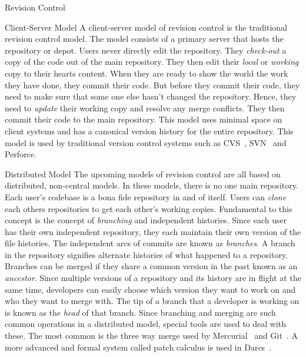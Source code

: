 \documentclass{article}
\begin{document}
\begin{section}{Revision Control}
	\begin{subsection}{Client-Server Model} A client-server model
	of revision control is the traditional revision control model.
	The model consists of a primary server that hosts the
	repository or depot.  Users never directly edit the
	repository.  They \emph{check-out} a copy of the code out of
	the main repository.  They then edit their \emph{local} or
	\emph{working} copy to their hearts content.  When they are
	ready to show the world the work they have done, they commit
	their code.  But before they commit their code, they need to
	make sure that some one else hasn't changed the repository.
	Hence, they need to \emph{update} their working copy and
	resolve any merge conflicts.  They then commit their code to
	the main repository.  This model uses minimal space on client
	systems and has a canonical version history for the entire
	repository.  This model is used by traditional version control
	systems such as CVS~\cite{Grune:CVS},
	SVN~\cite{CollabNet:Subversion} and Perforce.
	\end{subsection}

	\begin{subsection}{Distributed Model} The upcoming models of
	revision control are all based on distributed, non-central
	models.  In these models, there is no one main repository.
	Each user's codebase is a bona fide repository in and of
	itself.  Users can \emph{clone} each others repositories to
	get each other's working copies.  Fundamental to this concept
	is the concept of \emph{branching} and independent histories.
	Since each user has their own independent repository, they
	each maintain their own version of the file histories.  The
	independent arcs of commits are known as \emph{branches}.  A
	branch in the repository signifies alternate histories of what
	happened to a repository.  Branches can be merged if they
	share a common version in the past known as an
	\emph{ancestor}.  Since multiple versions of a repository and
	its history are in flight at the same time, developers can
	easily choose which version they want to work on and who they
	want to merge with.  The tip of a branch that a developer is
	working on is known as the \emph{head} of that branch.  Since
	branching and merging are such common operations in a
	distributed model, special tools are used to deal with these.
	The most common is the three way merge used by
	Mercurial~\cite{Mackall:Mercurial} and
	Git~\cite{Torvalds:Git}.  A more advanced and formal system
	called patch calculus is used in Darcs~\cite{Roundy:Darcs}.
	\end{subsection}


\end{section}
\end{document}
